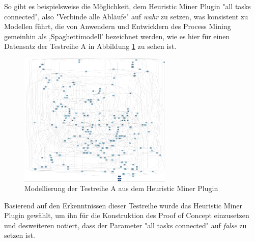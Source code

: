 So gibt es beispielsweise die Möglichkeit, dem Heuristic Miner Plugin "all tasks connected", also "Verbinde alle Abläufe" auf \textit{wahr} zu setzen, was konsistent zu Modellen führt, die von Anwendern und Entwicklern des Process Mining gemeinhin als ,Spaghettimodell' bezeichnet werden, wie es hier für einen Datensatz der Testreihe A in Abbildung \ref{fig:A_heuristic_spagh} zu sehen ist.
\begin{figure}[!ht]
    \centering
    \includegraphics[width=0.65\textwidth,]{figures/Appbildungen/A_underfitted.PNG}
    \caption{Modellierung der Testreihe A aus dem Heuristic Miner Plugin}
    \label{fig:A_heuristic_spagh}
\end{figure}

Basierend auf den Erkenntnissen dieser Testreihe wurde das Heuristic Miner Plugin gewählt, um ihn für die Konstruktion des Proof of Concept einzusetzen und desweiteren notiert, dass der Parameter "all tasks connected" auf \textit{false} zu setzen ist.





